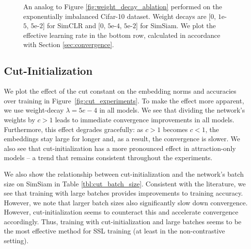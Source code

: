 \begin{figure}
    \centering
    \caption{An analog to Figure \ref{fig:weight_decay_ablation} performed on the exponentially imbalanced Cifar-10 dataset. Weight decays are [$0$, $1$e-$5$, $5$e-$2$] for SimCLR and [$0$, $5$e-$4$, $5$e-$2$] for SimSiam. We plot the effective learning rate in the bottom row, calculated in accordance with Section \ref{sec:convergence}.}
    \label{fig:weight_decay_imbalanced}
\end{figure}

\subsection{Cut-Initialization}
\label{app:cut_init}
We plot the effect of the cut constant on the embedding norms and accuracies over training in Figure~\ref{fig:cut_experiments}. To make the effect more apparent, we use weight-decay $\lambda=5e-4$ in all models. We see that dividing the network's weights by $c>1$ leads to immediate convergence improvements in all models. Furthermore, this effect degrades gracefully: as $c > 1$ becomes $c < 1$, the embeddings stay large for longer and, as a result, the convergence is slower. We also see that cut-initialization has a more pronounced effect in attraction-only models -- a trend that remains consistent throughout the experiments.

We also show the relationship between cut-initialization and the network's batch size on SimSiam in Table \ref{tbl:cut_batch_size}. Consistent with the literature, we see that training with large batches provides improvements to training accuracy. However, we note that larger batch sizes also significantly slow down convergence. However, cut-initialization seems to counteract this and accelerate convergence accordingly. Thus, training with cut-initialization and large batches seems to be the most effective method for SSL training (at least in the non-contrastive setting).

